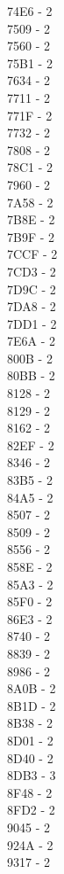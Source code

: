 \documentclass[10pt,letterpaper]{article}
\begin{document}
74E6 -  2\\
7509 -  2\\
7560 -  2\\
75B1 -  2\\
7634 -  2\\
7711 -  2\\
771F -  2\\
7732 -  2\\
7808 -  2\\
78C1 -  2\\
7960 -  2\\
7A58 -  2\\
7B8E -  2\\
7B9F -  2\\
7CCF -  2\\
7CD3 -  2\\
7D9C -  2\\
7DA8 -  2\\
7DD1 -  2\\
7E6A -  2\\
800B -  2\\
80BB -  2\\
8128 -  2\\
8129 -  2\\
8162 -  2\\
82EF -  2\\
8346 -  2\\
83B5 -  2\\
84A5 -  2\\
8507 -  2\\
8509 -  2\\
8556 -  2\\
858E -  2\\
85A3 -  2\\
85F0 -  2\\
86E3 -  2\\
8740 -  2\\
8839 -  2\\
8986 -  2\\
8A0B -  2\\
8B1D -  2\\
8B38 -  2\\
8D01 -  2\\
8D40 -  2\\
8DB3 -  3\\
8F48 -  2\\
8FD2 -  2\\
9045 -  2\\
924A -  2\\
9317 -  2\\
\end{document}
